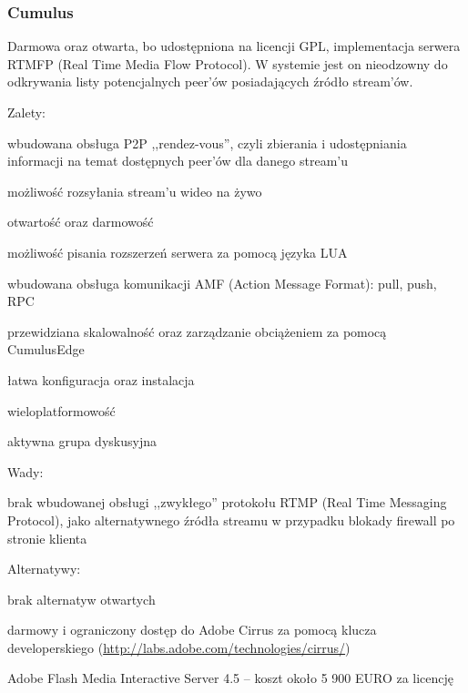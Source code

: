 \begin{minipage}{\textwidth}
    \subsubsection{Cumulus}
    Darmowa oraz otwarta, bo udostępniona na licencji GPL, implementacja serwera RTMFP (Real Time Media Flow Protocol). W systemie jest on nieodzowny do odkrywania listy potencjalnych peer'ów posiadających źródło stream'ów.

    Zalety:
    \begin{packed_item}
        \item{wbudowana obsługa P2P ,,rendez-vous'', czyli zbierania i udostępniania informacji na temat dostępnych peer'ów dla danego stream'u}
        \item{możliwość rozsyłania stream'u wideo na żywo}
        \item{otwartość oraz darmowość}
        \item{możliwość pisania rozszerzeń serwera za pomocą języka LUA}
        \item{wbudowana obsługa komunikacji AMF (Action Message Format): pull, push, RPC}
        \item{przewidziana skalowalność oraz zarządzanie obciążeniem za pomocą CumulusEdge}
        \item{łatwa konfiguracja oraz instalacja}
        \item{wieloplatformowość}
        \item{aktywna grupa dyskusyjna}
    \end{packed_item}

    Wady:
    \begin{packed_item}
        \item{brak wbudowanej obsługi ,,zwykłego'' protokołu RTMP (Real Time Messaging Protocol), jako alternatywnego źródła streamu w przypadku blokady firewall po stronie klienta}
    \end{packed_item}

    Alternatywy:
    \begin{packed_item}
        \item{brak alternatyw otwartych}
        \item{darmowy i ograniczony dostęp do Adobe Cirrus za pomocą klucza developerskiego (\url{http://labs.adobe.com/technologies/cirrus/})}
        \item{Adobe Flash Media Interactive Server 4.5 -- koszt około 5 900 EURO za licencję}
    \end{packed_item}
\end{minipage}

